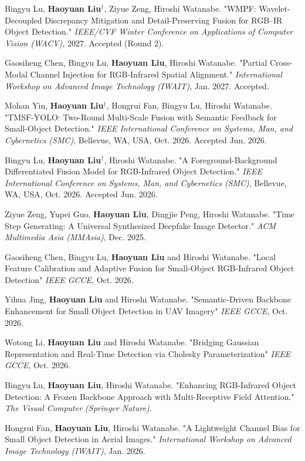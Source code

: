\documentclass[letterpaper,11pt]{article}
\newcommand{\resumeItem}[1]{
  \item[$\vcenter{\hbox{\tiny$\bullet$}}$]\small{
    {#1 \vspace{-2pt}}
  }
}
\begin{document}
    \resumeItem{Bingyu Lu, \textbf{Haoyuan Liu}$^{\dagger}$, Ziyue Zeng, Hiroshi Watanabe. "WMPF: Wavelet-Decoupled Discrepancy Mitigation and Detail-Preserving Fusion for RGB--IR Object Detection." \textit{IEEE/CVF Winter Conference on Applications of Computer Vision (WACV)}, 2027. Accepted (Round 2).}

    \resumeItem{Gaosiheng Chen, Bingyu Lu, \textbf{Haoyuan Liu}, Hiroshi Watanabe. "Partial Cross-Modal Channel Injection for RGB-Infrared Spatial Alignment." \textit{International Workshop on Advanced Image Technology (IWAIT)}, Jan. 2027. Accepted.}

    \resumeItem{Mohan Yin, \textbf{Haoyuan Liu}$^{\dagger}$, Hongrui Fan, Bingyu Lu, Hiroshi Watanabe. "TMSF-YOLO: Two-Round Multi-Scale Fusion with Semantic Feedback for Small-Object Detection." \textit{IEEE International Conference on Systems, Man, and Cybernetics (SMC)}, Bellevue, WA, USA, Oct. 2026. Accepted Jun. 2026.}

    \resumeItem{Bingyu Lu, \textbf{Haoyuan Liu}$^{\dagger}$, Hiroshi Watanabe. "A Foreground-Background Differentiated Fusion Model for RGB-Infrared Object Detection." \textit{IEEE International Conference on Systems, Man, and Cybernetics (SMC)}, Bellevue, WA, USA, Oct. 2026. Accepted Jun. 2026.}

    \resumeItem{Ziyue Zeng, Yupei Guo, \textbf{Haoyuan Liu}, Dingjie Peng, Hiroshi Watanabe. "Time Step Generating: A Universal Synthesized Deepfake Image Detector." \textit{ACM Multimedia Asia (MMAsia)}, Dec. 2025.}

    \resumeItem{Gaosiheng Chen, Bingyu Lu, \textbf{Haoyuan Liu} and Hiroshi Watanabe. "Local Feature Calibration and Adaptive Fusion for Small-Object RGB-Infrared Object Detection" \textit{IEEE GCCE}, Oct. 2026.}

    \resumeItem{Yihua Jing, \textbf{Haoyuan Liu} and Hiroshi Watanabe. "Semantic-Driven Backbone Enhancement for Small Object Detection in UAV Imagery" \textit{IEEE GCCE}, Oct. 2026.}

    \resumeItem{Wotong Li, \textbf{Haoyuan Liu} and Hiroshi Watanabe. "Bridging Gaussian Representation and Real-Time Detection via Cholesky Parameterization" \textit{IEEE GCCE}, Oct. 2026.}

    \resumeItem{Bingyu Lu, \textbf{Haoyuan Liu}, Hiroshi Watanabe. "Enhancing RGB-Infrared Object Detection: A Frozen Backbone Approach with Multi-Receptive Field Attention." \textit{The Visual Computer (Springer Nature)}.}
  
    \resumeItem{Hongrui Fan, \textbf{Haoyuan Liu}, Hiroshi Watanabe. "A Lightweight Channel Bias for Small Object Detection in Aerial Images." \textit{International Workshop on Advanced Image Technology (IWAIT)}, Jan. 2026.}
\end{document}
